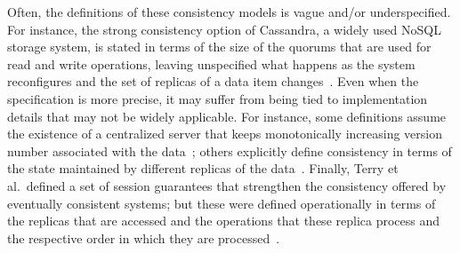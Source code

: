 \documentclass[journal,compsoc]{IEEEtran}
\begin{document}
Often, the definitions of these consistency models is vague and/or underspecified. For instance, the strong consistency option of Cassandra, a widely used NoSQL storage system, is stated in terms of the size of the quorums that are used for read and write operations, leaving unspecified what happens as the system reconfigures and the set of replicas of a data item changes~\cite{cassandra-consistency}.
Even when the specification is more precise, it may suffer from being tied to implementation details that may not be widely applicable. For instance, some definitions assume the existence of a centralized server that keeps monotonically increasing version number associated with the data~\cite{DBLP:conf/icde/AdyaLO00}; others explicitly define consistency in terms of the state maintained by different replicas of the data~\cite{Li:2012:MGS:2387880.2387906}. Finally, Terry et al.\ defined a set of session guarantees that strengthen the consistency offered by eventually consistent systems; but these were defined operationally in terms of the replicas that are accessed and the operations that these replica process and the respective order in which they are processed~\cite{bayou}. 
\end{document}
